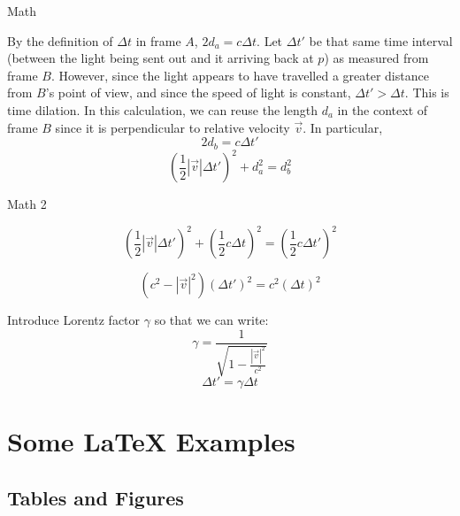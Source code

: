 \documentclass{beamer}
\begin{document}
\begin{frame}{Math}
\begin{block}{}

By the definition of $\Delta t$ in frame $A$, $2 d_a = c \Delta t$.
\newline
\newline
Let $\Delta t'$ be that same time interval (between the light being sent out and it arriving back at $p$) as measured from frame $B$. However, since the light appears to have travelled a greater distance from $B$'s point of view, and since the speed of light is constant, $\Delta t' > \Delta t$. This is time dilation.
\newline \newline
In this calculation, we can reuse the length $d_a$ in the context of frame $B$ since it is perpendicular to relative velocity $\vec{v}$. In particular,
$$
2 d_b = c \Delta t'
$$
$$
\left(\frac{1}{2} |\vec{v}| \Delta t'\right)^2 + d_a^2 = d_b^2
$$

\end{block}
\end{frame}

\begin{frame}{Math 2}
\begin{block}

$$
\left(\frac{1}{2} |\vec{v}| \Delta t'\right)^2
+ \left(\frac{1}{2} c \Delta t \right)^2
= \left( \frac{1}{2} c \Delta t' \right)^2
$$

$$
\left(c^2 - |\vec{v}|^2\right) \left(\Delta t'\right)^2 = c^2 \left(\Delta t\right)^2
$$
\end{block}
\begin{block}

Introduce Lorentz factor $\gamma$ so that we can write:
$$\gamma = \frac{1}{\sqrt{1 - \frac{|\vec{v}|^2}{c^2}}}$$
$$\Delta t' = \gamma \Delta t$$
\end{block}

\end{frame}


\section{Some \LaTeX{} Examples}

\subsection{Tables and Figures}
\end{document}
